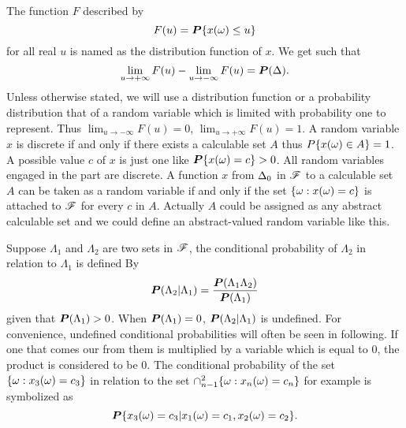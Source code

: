The function $F$ described by
\begin{equation}
    F(u)=\boldsymbol{P}\{x(\omega)\leq u\}
\end{equation}
for all real $u$ is named as the distribution function of $x$. We get such that
\begin{equation}
    \lim_{u\to +\infty} F(u) - \lim_{u\to -\infty} F(u) = \boldsymbol{P}(\Delta).
\end{equation}
Unless otherwise stated, we will use a distribution function or a probability distribution that of a random variable which is limited with probability one to represent. Thus $\lim_{u\to -\infty} F(u) = 0$, $\lim_{u\to +\infty} F(u) = 1$. A random variable $x$ is discrete if and only if there exists a calculable set $A$ thus $P\{x(\omega)\in A\} = 1$. A possible value $c$ of $x$ is just one like $\boldsymbol{P}\{x(\omega)=c\}>0$. All random variables engaged in the part are discrete. A function $x$ from $\Delta_0$ in $\mathscr{F}$ to a calculable set $A$ can be taken as a random variable if and only if the set $\{ \omega : x(\omega) = c\}$ is attached to $\mathscr{F}$ for every $c$ in $A$. Actually $A$ could be assigned as any abstract calculable set and we could define an abstract-valued random variable like this.

Suppose $\Lambda_1$ and $\Lambda_2$ are two sets in $\mathscr{F}$, the conditional probability of $\Lambda_2$ in relation to $\Lambda_1$ is defined By
\begin{equation}
    \boldsymbol{P}(\Lambda_2|\Lambda_1) = \frac{\boldsymbol{P}(\Lambda_1 \Lambda_2)}{\boldsymbol{P}(\Lambda_1)}
\end{equation}
given that $\boldsymbol{P}(\Lambda_1)>0$. When $\boldsymbol{P}(\Lambda_1)=0$, $\boldsymbol{P}(\Lambda_2|\Lambda_1)$ is undefined. For convenience, undefined conditional probabilities will often be seen in following. If one that comes our from them is multiplied by a variable which is equal to 0, the product is considered to be 0. The conditional probability of the set $\{\omega :x_3(\omega) = c_3\}$ in relation to the set $\cap_{n-1}^2 \{\omega : x_n(\omega)=c_n\}$ for example is symbolized as
\begin{equation}
    \boldsymbol{P}\{x_3(\omega)=c_3|x_1(\omega)=c_1, x_2(\omega)=c_2\}.
\end{equation}

